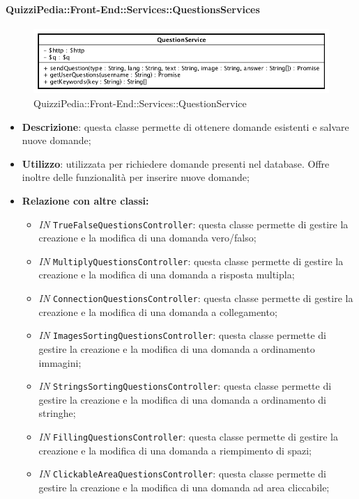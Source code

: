 \paragraph{QuizziPedia::Front-End::Services::QuestionsServices}
\begin{figure}[ht]
	\centering
	\includegraphics[scale=0.60]{UML/Classi/Front-End/QuizziPedia_Front-end_Services_QuestionService.png}
	\caption{QuizziPedia::Front-End::Services::QuestionService}
\end{figure}\FloatBarrier
\begin{itemize}
	\item \textbf{Descrizione}: questa classe permette di ottenere domande esistenti e salvare nuove domande;
	\item \textbf{Utilizzo}: utilizzata per richiedere domande presenti nel database. Offre inoltre delle funzionalità per inserire nuove domande;
	\item \textbf{Relazione con altre classi:}
	\begin{itemize}
		\item \textit{IN} \texttt{TrueFalseQuestionsController}: questa classe permette di gestire la creazione e la modifica di una domanda vero/falso;
		\item \textit{IN} \texttt{MultiplyQuestionsController}: questa classe permette di gestire la creazione e la modifica di una domanda a risposta multipla; 
		\item \textit{IN} \texttt{ConnectionQuestionsController}: questa classe permette di gestire la creazione e la modifica di una domanda a collegamento;
		\item \textit{IN} \texttt{ImagesSortingQuestionsController}: questa classe permette di gestire la creazione e la modifica di una domanda a ordinamento immagini;
		\item \textit{IN} \texttt{StringsSortingQuestionsController}: questa classe permette di gestire la creazione e la modifica di una domanda a ordinamento di stringhe;
		\item \textit{IN} \texttt{FillingQuestionsController}: questa classe permette di gestire la creazione e la modifica di una domanda a riempimento di spazi; 
		\item \textit{IN} \texttt{ClickableAreaQuestionsController}: questa classe permette di gestire la creazione e la modifica di una domanda ad area cliccabile;

\end{itemize}
\end{itemize}
